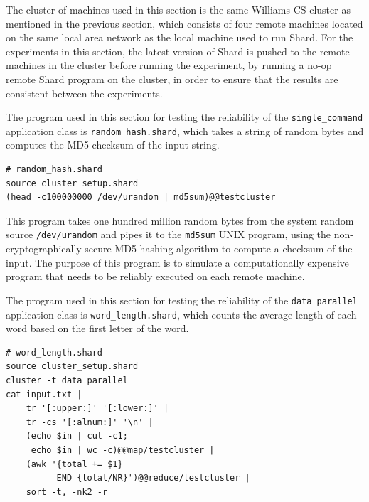 \documentclass[oneside]{report}
\begin{document}
The cluster of machines used in this section is the same Williams CS cluster as mentioned in the previous section, which consists of four remote machines located on the same local area network as the local machine used to run Shard.
For the experiments in this section, the latest version of Shard is pushed to the remote machines in the cluster before running the experiment, by running a no-op remote Shard program on the cluster, in order to ensure that the results are consistent between the experiments.

The program used in this section for testing the reliability of the \texttt{single\_command} application class is \texttt{random\_hash.shard}, which takes a string of random bytes and computes the MD5 checksum of the input string.

\begin{minipage}[c]{\textwidth-15pt}
  \begin{lstlisting}[language=Shard]
# random_hash.shard
source cluster_setup.shard
(head -c100000000 /dev/urandom | md5sum)@@testcluster
\end{lstlisting}
  \smallskip
\end{minipage}

\begin{sloppypar}
  This program takes one hundred million random bytes from the system random source \texttt{/dev/urandom} and pipes it to the \texttt{md5sum} UNIX program, using the non-cryptographically-secure MD5 hashing algorithm to compute a checksum of the input.
  The purpose of this program is to simulate a computationally expensive program that needs to be reliably executed on each remote machine.
\end{sloppypar}

\begin{sloppypar}
  The program used in this section for testing the reliability of the \texttt{data\_parallel} application class is \texttt{word\_length.shard}, which counts the average length of each word based on the first letter of the word.
\end{sloppypar}

\begin{minipage}[c]{\textwidth-15pt}
  \begin{lstlisting}[language=Shard]
# word_length.shard
source cluster_setup.shard
cluster -t data_parallel
cat input.txt |
    tr '[:upper:]' '[:lower:]' |
    tr -cs '[:alnum:]' '\n' |
    (echo $in | cut -c1;
     echo $in | wc -c)@@map/testcluster |
    (awk '{total += $1}
          END {total/NR}')@@reduce/testcluster |
    sort -t, -nk2 -r
\end{lstlisting}
  \smallskip
\end{minipage}
\end{document}
